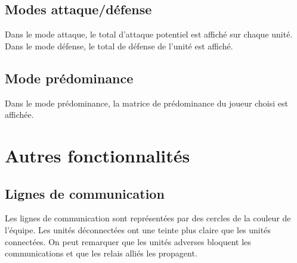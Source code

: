 			\clearpage

		\subsection{Modes attaque/défense}
			Dans le mode attaque, le total d'attaque potentiel est affiché sur chaque unité.
			Dans le mode défense, le total de défense de l'unité est affiché.
		
			\clearpage	

		\subsection{Mode prédominance}
			Dans le mode prédominance, la matrice de prédominance du joueur choisi est affichée.

			\clearpage

	\section{Autres fonctionnalités}

		\subsection{Lignes de communication}
			Les lignes de communication sont représentées par des cercles de la couleur de l'équipe.
			Les unités déconnectées ont une teinte plus claire que les unités connectées.
			On peut remarquer que les unités adverses bloquent les communications et que les relais alliés les propagent.

			\clearpage
